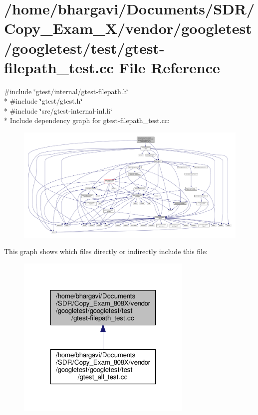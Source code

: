 \hypertarget{gtest-filepath__test_8cc}{}\section{/home/bhargavi/\+Documents/\+S\+D\+R/\+Copy\+\_\+\+Exam\+\_\+X/vendor/googletest/googletest/test/gtest-\/filepath\+\_\+test.cc File Reference}
\label{gtest-filepath__test_8cc}
{\ttfamily \#include \char`\"{}gtest/internal/gtest-\/filepath.\+h\char`\"{}}\\*
{\ttfamily \#include \char`\"{}gtest/gtest.\+h\char`\"{}}\\*
{\ttfamily \#include \char`\"{}src/gtest-\/internal-\/inl.\+h\char`\"{}}\\*
Include dependency graph for gtest-\/filepath\+\_\+test.cc\+:
\nopagebreak
\begin{figure}[H]
\begin{center}
\leavevmode
\includegraphics[width=350pt]{gtest-filepath__test_8cc__incl}
\end{center}
\end{figure}
This graph shows which files directly or indirectly include this file\+:
\nopagebreak
\begin{figure}[H]
\begin{center}
\leavevmode
\includegraphics[width=238pt]{gtest-filepath__test_8cc__dep__incl}
\end{center}
\end{figure}
